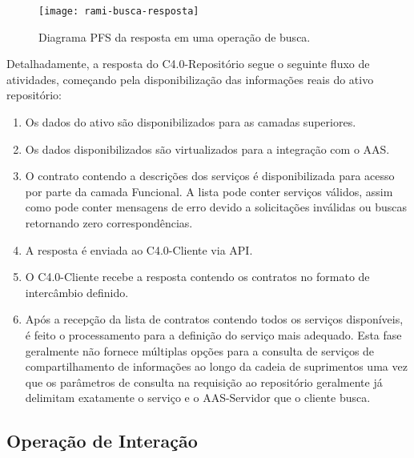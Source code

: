 	\begin{figure}[htb]
		\centering
		\label{fig:rami-busca-resposta}
		\texttt{[image: rami-busca-resposta]}
		\caption{Diagrama PFS da resposta em uma operação de busca.}
	\end{figure}

	Detalhadamente, a resposta do C4.0-Repositório segue o seguinte fluxo de atividades, começando pela disponibilização das informações reais do ativo repositório:
	
	\begin{enumerate}
		\item Os dados do ativo são disponibilizados para as camadas superiores.
		
		\item Os dados disponibilizados são virtualizados para a integração com o AAS.
		
		
		\item O contrato contendo a descrições dos serviços é disponibilizada para acesso por parte da camada Funcional. A lista  pode conter serviços válidos, assim como pode conter mensagens de erro devido a solicitações inválidas ou buscas retornando zero correspondências.

		\item A resposta é enviada ao C4.0-Cliente via API.
		
		\item O C4.0-Cliente recebe a resposta contendo os contratos no formato de intercâmbio definido.
		
		\item Após a recepção da lista de contratos contendo todos os serviços disponíveis, é feito o processamento para a definição do serviço mais adequado. Esta fase geralmente não fornece múltiplas opções para a consulta de serviços de compartilhamento de informações ao longo da cadeia de suprimentos uma vez que os parâmetros de consulta na requisição ao repositório geralmente já delimitam exatamente o serviço e o AAS-Servidor que o cliente busca.
	\end{enumerate}

\subsection{Operação de Interação}

